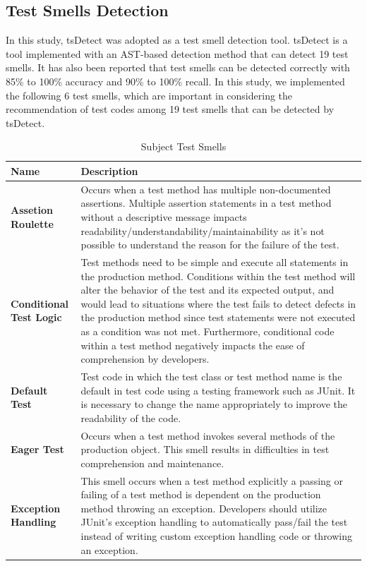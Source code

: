 \documentclass[conference]{IEEEtran}
\begin{document}
\subsection{Test Smells Detection}
In this study, tsDetect\cite{b10} was adopted as a test smell detection tool. tsDetect is a tool implemented with an AST-based detection method that can detect 19 test smells. It has also been reported that test smells can be detected correctly with 85\% to 100\% accuracy and 90\% to 100\% recall. In this study, we implemented the following 6 test smells, which are important in considering the recommendation of test codes among 19 test smells that can be detected by tsDetect\cite{b9}.
\begin{table}[hbtp]
\caption{Subject Test Smells}
\begin{tabular}{|l|p{5.2cm}|}
\hline
\textbf{Name}                   & \textbf{Description}                                                                                                       \\ \hline
\textbf{Assetion Roulette}        & Occurs when a test method has multiple non-documented assertions. Multiple assertion statements in a test method without a descriptive message impacts readability/understandability/maintainability as it’s not possible to understand the reason for the failure of the test.  \\ \hline
\textbf{Conditional Test Logic} & Test methods need to be simple and execute all statements in the production method. Conditions within the test method will alter the behavior of the test and its expected output, and would lead to situations where the test fails to detect defects in the production method since test statements were not executed as a condition was not met. Furthermore, conditional code within a test method negatively impacts the ease of comprehension by developers. \\ \hline
\textbf{Default Test}            & Test code in which the test class or test method name is the default in test code using a testing framework such as JUnit. It is necessary to change the name appropriately to improve the readability of the code.                                                                                                      \\ \hline
\textbf{Eager Test }             & Occurs when a test method invokes several methods of the production object. This smell results in difficulties in test comprehension and maintenance. \\ \hline
\textbf{Exception Handling}      & This smell occurs when a test method explicitly a passing or failing of a test method is dependent on the production method throwing an exception. Developers should utilize JUnit's exception handling to automatically pass/fail the test instead of writing custom exception handling code or throwing an exception. \\ \hline

\end{tabular}
\end{table}
\end{document}
